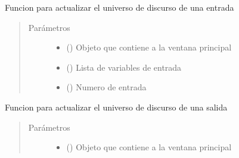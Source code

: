 \documentclass[letterpaper,10pt,spanish]{sphinxmanual}
\begin{document}
\begin{fulllineitems}

\begin{fulllineitems}
\label{\detokenize{codigos/rutinas_fuzzy:rutinas_fuzzy.FuzzyController.update_rango_input}}
Funcion para actualizar el universo de discurso de una entrada
\begin{quote}\begin{description}
\item[{Parámetros}] \leavevmode\begin{itemize}
\item {} 
 () \textendash{} Objeto que contiene a la ventana principal

\item {} 
 () \textendash{} Lista de variables de entrada

\item {} 
 () \textendash{} Numero de entrada

\end{itemize}

\end{description}\end{quote}

\end{fulllineitems}


\begin{fulllineitems}
\label{\detokenize{codigos/rutinas_fuzzy:rutinas_fuzzy.FuzzyController.update_rango_output}}
Funcion para actualizar el universo de discurso de una salida
\begin{quote}\begin{description}
\item[{Parámetros}] \leavevmode\begin{itemize}
\item {} 
 () \textendash{} Objeto que contiene a la ventana principal


\end{itemize}
\end{description}
\end{quote}
\end{fulllineitems}
\end{fulllineitems}
\end{document}

